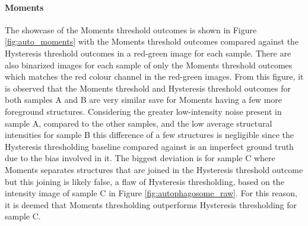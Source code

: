 \FloatBarrier
\paragraph{Moments}
The showcase of the Moments threshold outcomes is shown in Figure \ref{fig:auto_moments} with the Moments threshold outcomes compared against the Hysteresis threshold outcomes in a red-green image for each sample. There are also binarized images for each sample of only the Moments threshold outcomes which matches the red colour channel in the red-green images. From this figure, it is observed that the Moments threshold and Hysteresis threshold outcomes for both samples A and B are very similar save for Moments having a few more foreground structures. Considering the greater low-intensity noise present in sample A, compared to the other samples, and the low average structural intensities for sample B this difference of a few structures is negligible since the Hysteresis thresholding baseline compared against is an imperfect ground truth due to the bias involved in it. The biggest deviation is for sample C where Moments separates structures that are joined in the Hysteresis threshold outcome but this joining is likely false, a flaw of Hysteresis thresholding, based on the intensity image of sample C in Figure \ref{fig:autophagosome_raw}. For this reason, it is deemed that Moments thresholding outperforms Hysteresis thresholding for sample C.
